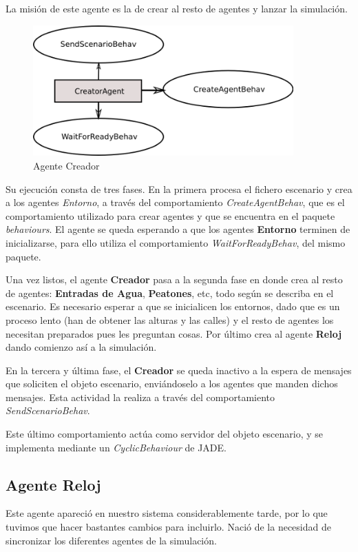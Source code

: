 La misión de este agente es la de crear al resto de agentes y lanzar la
simulación.

\begin{figure}[H]
 \centering
 \includegraphics[width=100mm]{figuras/cap5/ag_creator.png}
 \caption{Agente Creador}
\end{figure}

Su ejecución consta de tres fases. En la primera procesa el fichero escenario y
crea a los agentes {\em Entorno}, a través del comportamiento {\em
CreateAgentBehav}, que es el comportamiento utilizado para crear agentes y que
se encuentra en el paquete {\em behaviours}. El agente se queda esperando a que
los agentes {\bf Entorno} terminen de inicializarse, para ello utiliza el
comportamiento {\em WaitForReadyBehav}, del mismo paquete.

Una vez listos, el agente {\bf Creador} pasa a la segunda fase en donde crea al
resto de agentes: {\bf Entradas de Agua}, {\bf Peatones}, etc, todo según se
describa en el escenario. Es necesario esperar a que se inicialicen los
entornos, dado que es un proceso lento (han de obtener las alturas y las
calles) y el resto de agentes los necesitan preparados pues les preguntan cosas.
Por último crea al agente {\bf Reloj} dando comienzo así a la simulación.

En la tercera y última fase, el {\bf Creador} se queda inactivo a la espera de
mensajes que soliciten el objeto escenario, enviándoselo a los agentes que
manden dichos mensajes. Esta actividad la realiza a través del comportamiento
{\em SendScenarioBehav}.

Este último comportamiento actúa como servidor del objeto escenario, y se
implementa mediante un {\em CyclicBehaviour} de JADE.

\subsection*{Agente Reloj}

Este agente apareció en nuestro sistema considerablemente tarde, por lo que
tuvimos que hacer bastantes cambios para incluirlo. Nació de la necesidad de
sincronizar los diferentes agentes de la simulación.

